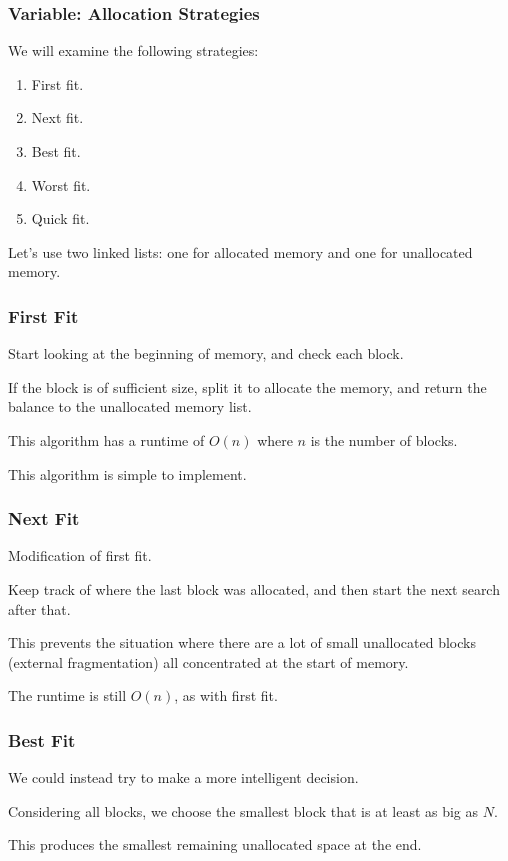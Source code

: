 \begin{frame}
\frametitle{Variable: Allocation Strategies}

We will examine the following strategies:

\begin{enumerate}
	\item First fit.
	\item Next fit.
	\item Best fit.
	\item Worst fit.
	\item Quick fit.
\end{enumerate}

Let's use two linked lists: one for allocated memory and one for unallocated memory. 

\end{frame}

\begin{frame}
\frametitle{First Fit}

Start looking at the beginning of memory, and check each block. 

If the block is of sufficient size, split it to allocate the memory, and return the balance to the unallocated memory list. 

This algorithm has a runtime of $O(n)$ where $n$ is the number of blocks. 

This algorithm is simple to implement. 



\end{frame}

\begin{frame}
\frametitle{Next Fit}

Modification of first fit.

Keep track of where the last block was allocated, and then start the next search after that. 

This prevents the situation where there are a lot of small unallocated blocks (external fragmentation) all concentrated at the start of memory. 

The runtime is still $O(n)$, as with first fit.

\end{frame}



\begin{frame}
\frametitle{Best Fit}

We could instead try to make a more intelligent decision. 

Considering all blocks, we choose the smallest block that is at least as big as $N$.

This produces the smallest remaining unallocated space at the end. 

\end{frame}

